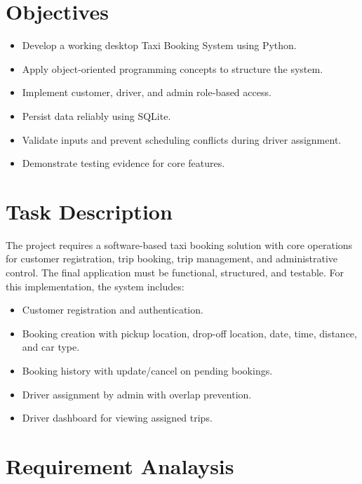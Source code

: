\documentclass[12pt,a4paper]{article}
\begin{document}
\section{Objectives}
\begin{itemize}[noitemsep]
    \item Develop a working desktop Taxi Booking System using Python.
    \item Apply object-oriented programming concepts to structure the system.
    \item Implement customer, driver, and admin role-based access.
    \item Persist data reliably using SQLite.
    \item Validate inputs and prevent scheduling conflicts during driver assignment.
    \item Demonstrate testing evidence for core features.
\end{itemize}

\section{Task Description}
The project requires a software-based taxi booking solution with core operations for customer registration, trip booking, trip management, and administrative control. The final application must be functional, structured, and testable. For this implementation, the system includes:

\begin{itemize}[noitemsep]
    \item Customer registration and authentication.
    \item Booking creation with pickup location, drop-off location, date, time, distance, and car type.
    \item Booking history with update/cancel on pending bookings.
    \item Driver assignment by admin with overlap prevention.
    \item Driver dashboard for viewing assigned trips.
\end{itemize}

\section{Requirement Analaysis}
\end{document}
